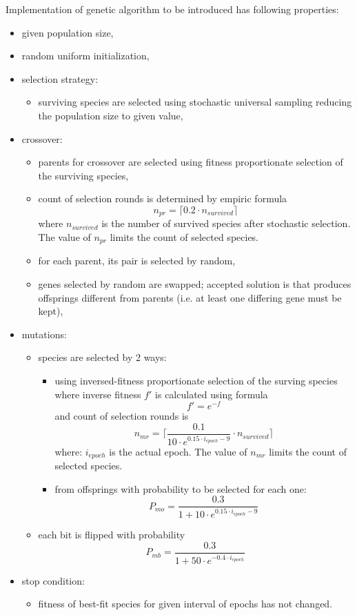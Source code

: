 \documentclass[a4paper]{IEEEtran}
\begin{document}
Implementation of genetic algorithm to be introduced has following properties:
\begin{itemize}
	\item given population size,
	\item random uniform initialization,
	\item selection strategy:
	\begin{itemize}
		\item surviving species are selected using stochastic universal 
		sampling reducing 
		the population size to given value,
	\end{itemize}
	\item crossover:
	\begin{itemize}
		\item parents for crossover are selected using fitness proportionate
		selection of the surviving species,
		\item count of selection rounds is determined by empiric formula
		\[ n_{pr} = \lceil 0.2\cdot n_{survived} \rceil \] 		
		where $ n_{survived} $ is the number of survived species after stochastic selection.
		The value of $ n_{pr} $ limits the count of selected species.
		\item for each parent, its pair is selected by random,
		\item genes selected by random are swapped; accepted solution is that 
		produces  offsprings different from parents (i.e. at least one differing gene must be
		kept),
	\end{itemize}
	\item mutations:
	\begin{itemize}
		\item species are selected by 2 ways:
		\begin{itemize}
			\item using inversed-fitness proportionate
			selection of the surving species where inverse fitness $ f' $ is 
			calculated using formula \[  f' = e^{-f} \]
			and count of selection rounds is
			\[ n_{mr} = \lceil \dfrac{0.1}{10\cdot e^{0.15\cdot i_{epoch} - 9}} 
			\cdot n_{survived} \rceil \]
			where: $ i_{epoch} $ is the actual epoch.
			The value of $ n_{mr} $ limits the count of selected species.
			\item from offsprings with probability to be selected for each one:
			\[ P_{mo} = \dfrac{0.3}{1+10\cdot e^{0.15\cdot i_{epoch} - 9}} \]
		\end{itemize}
		\item each bit is flipped with probability\\
		\[ P_{mb} = \dfrac{0.3}{1+50\cdot e^{-0.4\cdot i_{epoch}}} \]
	\end{itemize}
	\item stop condition:
	\begin{itemize}
		\item fitness of best-fit species for given interval of epochs has not changed.
	\end{itemize}
	
\end{itemize}
\end{document}
